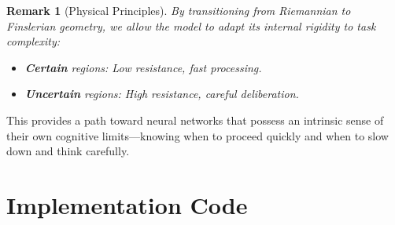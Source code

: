 \documentclass[12pt,letterpaper,twoside]{article}
\newtheorem{remarque}{Remark}[section]
\begin{document}
\begin{remarque}[Physical Principles]
By transitioning from Riemannian to Finslerian geometry, we allow the model to adapt its internal rigidity to task complexity:
\begin{itemize}
\item \textbf{Certain} regions: Low resistance, fast processing.
\item \textbf{Uncertain} regions: High resistance, careful deliberation.
\end{itemize}
\end{remarque}

This provides a path toward neural networks that possess an intrinsic sense of their own cognitive limits---knowing when to proceed quickly and when to slow down and think carefully.

\clearpage

\appendix

\section{Implementation Code}
\end{document}
